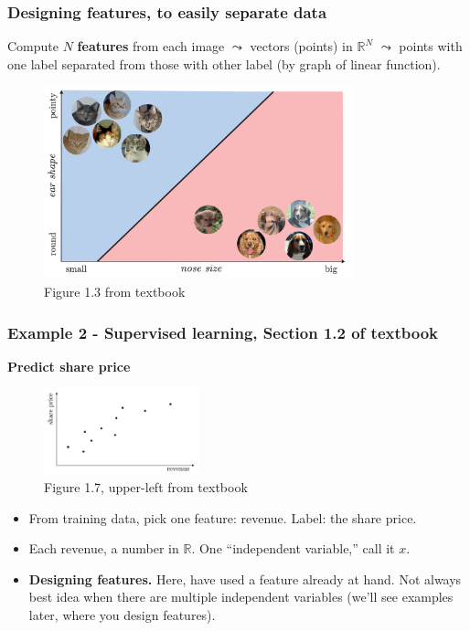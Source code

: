 \documentclass{beamer}
\theoremstyle{example}
\newcommand{\bb}[1]{\mathbb{#1}}
\begin{document}
\begin{frame}
    \frametitle{Designing features, to easily separate data}
    Compute $N$ \textbf{features} from each image $\leadsto$ vectors (points) in $\bb R^N$ $\leadsto$ points with one label separated from those with other label (by graph of linear function).

    \begin{figure}
        \includegraphics[width=0.8\textwidth]{../../Images/Fig1-3.png}
    \caption*{Figure 1.3 from textbook}
    \end{figure}
\end{frame}

\begin{frame}
\frametitle{Example 2 - Supervised learning, Section 1.2 of textbook}
\textbf{Predict share price}

\begin{figure}
\includegraphics[width=0.4\textwidth]{../../Images/Fig1-7a.png}
\caption*{Figure 1.7, upper-left from textbook}
\end{figure}

\begin{itemize}
    \item From training data, pick one feature: revenue. Label: the share price.
    \item Each revenue, a number in $\bb R$. One ``independent variable,'' call it $x$.
    \item \textbf{Designing features.} Here, have used a feature already at hand. Not always best idea when there are multiple independent variables (we'll see examples later, where you design features).
\end{itemize}
\end{frame}
\end{document}

